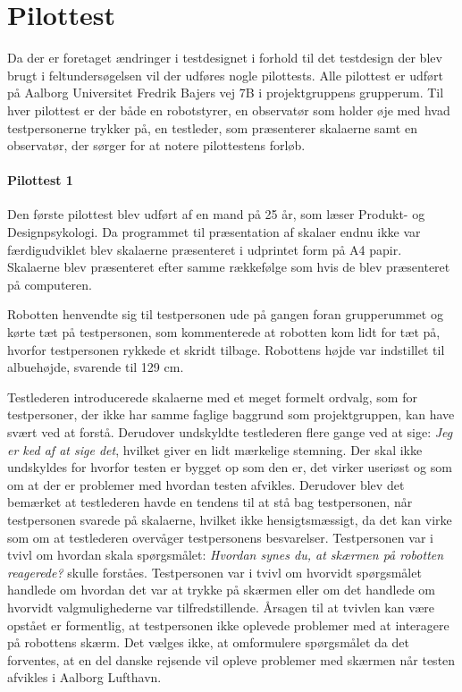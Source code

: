 \chapter{Pilottest}
\label{TestAfSkalaPilottest}
%
Da der er foretaget ændringer i testdesignet i forhold til det testdesign der blev brugt i feltundersøgelsen vil der udføres nogle pilottests. Alle pilottest er udført på Aalborg Universitet Fredrik Bajers vej 7B i projektgruppens grupperum. Til hver pilottest er der både en robotstyrer, en observatør som holder øje med hvad testpersonerne trykker på, en testleder, som præsenterer skalaerne samt en observatør, der sørger for at notere pilottestens forløb.  

\subsubsection*{Pilottest 1}
\label{TestAfSkalaerPilot1}
%
Den første pilottest blev udført af en mand på 25 år, som læser Produkt- og Designpsykologi. Da programmet til præsentation af skalaer endnu ikke var færdigudviklet blev skalaerne præsenteret i udprintet form på A4 papir. Skalaerne blev præsenteret efter samme rækkefølge som hvis de blev præsenteret på computeren.

Robotten henvendte sig til testpersonen ude på gangen foran grupperummet og kørte tæt på testpersonen, som kommenterede at robotten kom lidt for tæt på, hvorfor testpersonen rykkede et skridt tilbage. Robottens højde var indstillet til albuehøjde, svarende til 129 cm. 

Testlederen introducerede skalaerne med et meget formelt ordvalg, som for testpersoner, der ikke har samme faglige baggrund som projektgruppen, kan have svært ved at forstå. Derudover undskyldte testlederen flere gange ved at sige: \textit{Jeg er ked af at sige det}, hvilket giver en lidt mærkelige stemning. Der skal ikke undskyldes for hvorfor testen er bygget op som den er, det virker useriøst og som om at der er problemer med hvordan testen afvikles. Derudover blev det bemærket at testlederen havde en tendens til at stå bag testpersonen, når testpersonen svarede på skalaerne, hvilket ikke hensigtsmæssigt, da det kan virke som om at testlederen overvåger testpersonens besvarelser.\blankline
%
Testpersonen var i tvivl om hvordan skala spørgsmålet: \textit{Hvordan synes du, at skærmen på robotten reagerede?} skulle forståes. Testpersonen var i tvivl om hvorvidt spørgsmålet handlede om hvordan det var at trykke på skærmen eller om det handlede om hvorvidt valgmulighederne var tilfredstillende. Årsagen til at tvivlen kan være opstået er formentlig, at testpersonen ikke oplevede problemer med at interagere på robottens skærm. Det vælges ikke, at omformulere spørgsmålet da det forventes, at en del danske rejsende vil opleve problemer med skærmen når testen afvikles i Aalborg Lufthavn. 

